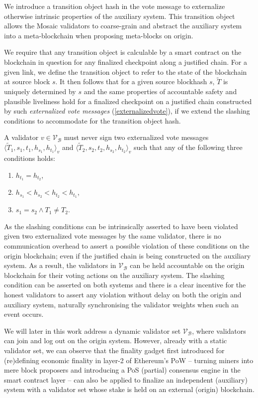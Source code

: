 \documentclass[12pt,a4paper]{article}
\begin{document}
We introduce a transition object hash in the vote message to externalize otherwise intrinsic properties of the auxiliary system.
This transition object allows the Mosaic validators to coarse-grain and abstract the auxiliary system into a meta-blockchain when proposing meta-blocks on origin.

We require that any transition object is calculable by a smart contract on the blockchain in question for any finalized checkpoint along a justified chain.
For a given link, we define the transition object to refer to the state of the blockchain at source block $s$. %
It then follows that for a given source blockhash $s$, $\tilde{T}$ is uniquely determined by $s$ and the same properties of accountable safety and plausible liveliness hold for a finalized checkpoint on a justified chain constructed by such \emph{externalized vote messages} (\ref{externalizedvote}), if we extend the slashing conditions to accommodate for the transition object hash.

A validator $v \in \mathcal{V}_\mathcal{B}$ must never sign two externalized vote messages $\langle \tilde{T}_1, s_1, t_1, h_{s_1}, h_{t_1}\rangle_v$ and $\langle \tilde{T}_2, s_2, t_2, h_{s_2}, h_{t_2}\rangle_v$ such that any of the following three conditions holds:
\begin{enumerate}
  \item $h_{t_1} = h_{t_2}$,
  \item $h_{s_1} < h_{s_2} < h_{t_2} < h_{t_1}$,
  \item $s_1 = s_2 \land T_1 \neq T_2$.
\end{enumerate}

As the slashing conditions can be intrinsically asserted to have been violated given two externalized vote messages by the same validator, there is no communication overhead to assert a possible violation of these conditions on the origin blockchain; even if the justified chain is being constructed on the auxiliary system.
As a result, the validators in $\mathcal{V}_\mathcal{B}$ can be held accountable on the origin blockchain for their voting actions on the auxiliary system.
The slashing condition can be asserted on both systems and there is a clear incentive for the honest validators to assert any violation without delay on both the origin and auxiliary system, naturally synchronising the validator weights when such an event occurs.

We will later in this work address a dynamic validator set $\mathcal{V}_\mathcal{B}$, where validators can join and log out on the origin system.
However, already with a static validator set, we can observe that the finality gadget first introduced for (re)defining economic finality in layer-2 of Ethereum's PoW -- turning miners into mere block proposers and introducing a PoS (partial) consensus engine in the smart contract layer -- can also be applied to finalize an independent (auxiliary) system with a validator set whose stake is held on an external (origin) blockchain.
\end{document}
